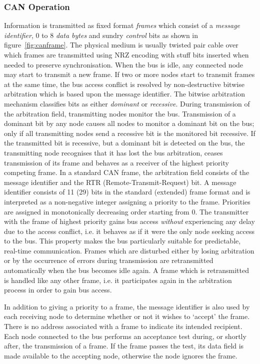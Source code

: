 \subsubsection{CAN Operation}
Information is transmitted as fixed format {\em frames\/} which consist of a
\emph{message identifier}, 0 to 8 \emph{data bytes} and sundry \emph{control}
bits as shown in figure~\ref{fig:canframe}. The physical medium is
usually twisted pair cable over which frames are transmitted using NRZ
encoding with stuff bits inserted when needed to preserve
synchronisation.  When the bus is idle, any connected node may start
to transmit a new frame.  If two or more nodes start to transmit
frames at the same time, the bus access conflict is resolved by
non-destructive bitwise arbitration which is based upon the message
identifier. The bitwise arbitration mechanism classifies bits as either
\emph{dominant} or \emph{recessive}. During transmission of the arbitration
field, transmitting nodes monitor the bus. Transmission of a dominant
bit by any node causes all nodes to monitor a dominant bit on the bus;
only if all transmitting nodes send a recessive bit is the monitored
bit recessive. If the transmitted bit is recessive, but a dominant bit
is detected on the bus, the transmitting node recognises that it has
lost the bus arbitration, ceases transmission of its frame and behaves
as a receiver of the highest priority competing frame. In a standard
CAN frame, the arbitration field consists of the message identifier
and the RTR (Remote-Transmit-Request) bit. A message identifier
consists of 11 (29) bits in the standard (extended) frame format and
is interpreted as a non-negative integer assigning a priority to the
frame. Priorities are assigned in monotonically decreasing order
starting from 0. The transmitter with the frame of highest priority
gains bus access {\em without\/} experiencing any delay due to the
access conflict, i.e. it behaves as if it were the only node seeking
access to the bus. This property makes the bus particularly suitable
for predictable, real-time communication. Frames which are disturbed
either by losing arbitration or by the occurrence of errors during
transmission are retransmitted automatically when the bus becomes idle
again.  A frame which is retransmitted is handled like any other
frame, i.e.  it participates again in the arbitration process in order
to gain bus access.

In addition to giving a priority to a frame, the message identifier is also
used by each receiving node to determine whether or not it wishes to `accept'
the frame. There is no address associated with a frame to indicate its
intended recipient. Each node connected to the bus performs an acceptance
test during, or shortly after, the transmission of a frame. If the frame
passes the test, its data field is made available to the accepting node,
otherwise the node ignores the frame.

